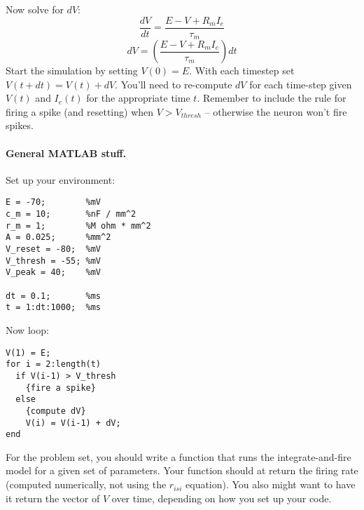 \documentclass[12pt]{article}
\begin{document}
Now solve for $dV$:
\[
\frac{dV}{dt} = \frac{E - V + R_mI_e}{\tau_m}
\]
\[
dV = (\frac{E - V + R_mI_e}{\tau_m})dt
\]
Start the simulation by setting $V(0) = E$.  With each timestep set $V(t+dt) = V(t) + dV$.
You'll need to re-compute $dV$ for each time-step given $V(t)$ and
$I_e(t)$ for the appropriate time $t$.  Remember to include the rule for
firing a spike (and resetting) when $V > V_{thresh}$ -- otherwise the
neuron won't fire spikes.



\paragraph{General MATLAB stuff.}
Set up your environment:
\begin{verbatim}
E = -70;        %mV
c_m = 10;       %nF / mm^2
r_m = 1;        %M ohm * mm^2
A = 0.025;      %mm^2
V_reset = -80;  %mV
V_thresh = -55; %mV
V_peak = 40;    %mV

dt = 0.1;       %ms
t = 1:dt:1000;  %ms
\end{verbatim}
Now loop:
\begin{verbatim}
V(1) = E;
for i = 2:length(t)
  if V(i-1) > V_thresh
    {fire a spike}
  else
    {compute dV}
    V(i) = V(i-1) + dV;
end
\end{verbatim}
For the problem set, you should write a function that runs the
integrate-and-fire model for a given set of parameters.  Your function
should at return the firing rate (computed numerically, not using the $r_{isi}$ equation).
You also might want to have it return the vector of $V$ over time,
depending on how you set up your code.
\end{document}
